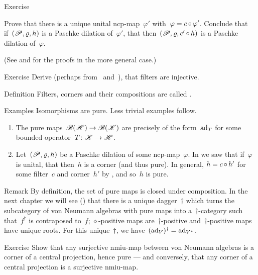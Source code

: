 \begin{parsec}
\begin{point}{Exercise}
\begin{enumerate}
    Prove that there is a unique unital ncp-map~$\varphi'$
        with~$\varphi = c \mathop{\circ} \varphi'$.
    Conclude that if~$(\mathscr{P}, \varrho, h)$ is a Paschke dilation
            of~$\varphi'$,
            that then~$(\mathscr{P}, \varrho, c' \mathop{\circ} h)$
            is a Paschke dilation of~$\varphi$.
\end{enumerate}
(See  and  for the proofs
        in the more general case.)
\end{point}
\begin{point}{Exercise}%
Derive (perhaps from~ and~),
    that filters are injective.
\end{point}
\end{parsec}
\begin{parsec}%
\begin{point}{Definition}%
    Filters, corners and their compositions are called .
\end{point}
\begin{point}{Examples}%
Isomorphisms are pure.  Less trivial examples follow.
\begin{enumerate}
\item
The pure maps~$\mathscr{B}(\mathscr{H}) \to \mathscr{B}(\mathscr{K})$
    are precisely of the form~$\mathrm{ad}_T$
    for some bounded operator~$T\colon \mathscr{K} \to \mathscr{H}$.
\item
Let~$(\mathscr{P}, \varrho, h)$ be a Paschke dilation of some ncp-map~$\varphi$.
In  we saw that if~$\varphi$ is unital,
        that then~$h$ is a corner (and thus pure).
In general, $h = c \mathop{\circ} h'$ for some filter~$c$ and corner~$h'$
    by ,
        and so~$h$ is pure.
\end{enumerate}
\end{point}
\begin{point}{Remark}%
By definition, the set of pure maps is closed under composition.
In the next chapter we will see () that
    there is a unique dagger~$\dagger$
    which turns the subcategory of von Neumann
    algebras with pure maps into a~$\dagger$-category
    such that~$f^\dagger$ is contraposed to~$f$;
            $\diamond$-positive maps are~$\dagger$-positive
            and~$\dagger$-positive maps have unique roots.
For this unique~$\dagger$, we have~$(\mathrm{ad}_V)^\dagger = \mathrm{ad}_{V^*}$.
\end{point}
\begin{point}{Exercise}%
Show that any surjective nmiu-map between von Neumann algebras
        is a corner of a central projection, hence pure
        --- and conversely,
        that any corner of a central projection is a surjective nmiu-map.
\end{point}
\end{parsec}

